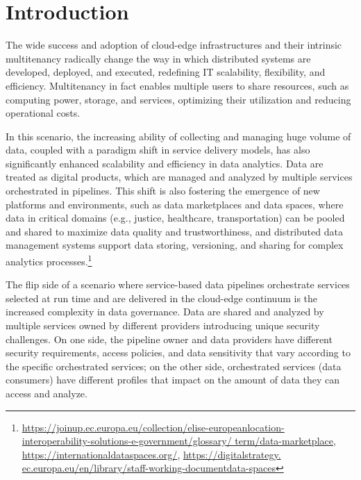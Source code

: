 \section{Introduction}
{\color{OurColor}The wide success and adoption of cloud-edge infrastructures and their intrinsic multitenancy radically change the way in which distributed systems are developed, deployed, and executed, redefining IT scalability, flexibility, and efficiency.} Multitenancy in fact enables multiple users to share resources, such as computing power, storage, and services, optimizing their utilization and reducing operational costs.

{\color{OurColor}In this scenario, the increasing ability of collecting and managing huge volume of data, coupled with a paradigm shift in service delivery models, has also significantly enhanced scalability and efficiency in data analytics. Data are treated as digital products, which are managed and analyzed by multiple services orchestrated in pipelines. This shift is also fostering the emergence of new platforms and environments, such as data marketplaces and data spaces, where data in critical domains (e.g., justice, healthcare, transportation) can be pooled and shared to maximize data quality and trustworthiness,
and distributed data management systems support data storing, versioning, and sharing for complex analytics processes.}\footnote{\url{https://joinup.ec.europa.eu/collection/elise-europeanlocation-
interoperability-solutions-e-government/glossary/
term/data-marketplace}, \url{https://internationaldataspaces.org/}, \url{https://digitalstrategy.
ec.europa.eu/en/library/staff-working-documentdata-spaces}}



The flip side of a scenario {\color{OurColor}where service-based data pipelines orchestrate services selected at run time and are delivered in the cloud-edge continuum} is the increased complexity in data governance. {\color{OurColor}Data are shared and analyzed by multiple services owned by different providers introducing unique security challenges. On one side, the pipeline owner and data providers have different security requirements, access policies, and data sensitivity that vary according to the specific orchestrated services; on the other side, orchestrated services (data consumers) have different profiles that impact on the amount of data they can access and analyze.}

